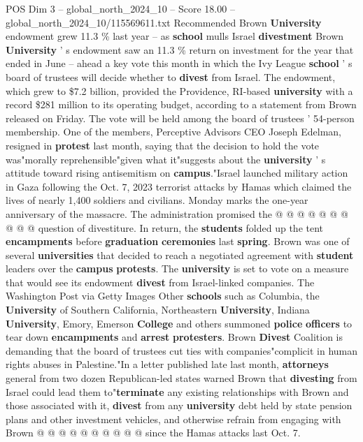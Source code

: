 \begin{textsample}{POS Dim 3 – global\_north\_2024\_10 – Score 18.00 – global\_north\_2024\_10/115569611.txt}  \label{ex:f3_pos_129}
Recommended Brown \textbf{University} endowment grew 11.3 \% last year -- as \textbf{school} mulls Israel \textbf{divestment} Brown \textbf{University} ' s endowment saw an 11.3 \% return on investment for the year that ended in June -- ahead a key vote this month in which the Ivy League \textbf{school} ' s board of trustees will decide whether to \textbf{divest} from Israel.
The endowment, which grew to \$7.2 billion, provided the Providence, RI-based \textbf{university} with a record \$281 million to its operating budget, according to a statement from Brown released on Friday.
The vote will be held among the board of trustees ' 54-person membership.
One of the members, Perceptive Advisors CEO Joseph Edelman, resigned in \textbf{protest} last month, saying that the decision to hold the vote was"morally reprehensible"given what it"suggests about the \textbf{university} ' s attitude toward rising antisemitism on \textbf{campus}."Israel launched military action in Gaza following the Oct. 7, 2023 terrorist attacks by Hamas which claimed the lives of nearly 1,400 soldiers and civilians.
Monday marks the one-year anniversary of the massacre.
The administration promised the @ @ @ @ @ @ @ @ @ @ question of divestiture.
In return, the \textbf{students} folded up the tent \textbf{encampments} before \textbf{graduation} \textbf{ceremonies} last \textbf{spring}.
Brown was one of several \textbf{universities} that decided to reach a negotiated agreement with \textbf{student} leaders over the \textbf{campus} \textbf{protests}.
The \textbf{university} is set to vote on a measure that would see its endowment \textbf{divest} from Israel-linked companies.
The Washington Post via Getty Images Other \textbf{schools} such as Columbia, the \textbf{University} of Southern California, Northeastern \textbf{University}, Indiana \textbf{University}, Emory, Emerson \textbf{College} and others summoned \textbf{police} \textbf{officers} to tear down \textbf{encampments} and \textbf{arrest} \textbf{protesters}.
Brown \textbf{Divest} Coalition is demanding that the board of trustees cut ties with companies"complicit in human rights abuses in Palestine."In a letter published late last month, \textbf{attorneys} general from two dozen Republican-led states warned Brown that \textbf{divesting} from Israel could lead them to"\textbf{terminate} any existing relationships with Brown and those associated with it, \textbf{divest} from any \textbf{university} debt held by state pension plans and other investment vehicles, and otherwise refrain from engaging with Brown @ @ @ @ @ @ @ @ @ @ since the Hamas attacks last Oct. 7.

\end{textsample}
